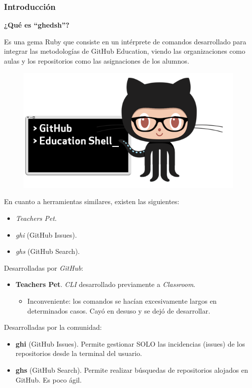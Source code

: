 \documentclass{beamer}
\begin{document}
\begin{frame}
  \frametitle{Introducción}
  \textbf{¿Qué es ``ghedsh''?}
  \bigskip

  Es una gema Ruby que consiste en un intérprete de comandos desarrollado para integrar las metodologías
  de GitHub Education, viendo las organizaciones como aulas y los repositorios como las asignaciones de los alumnos.
  
  \begin{center}
    \begin{figure}[!htb]  
        \includegraphics[width=\linewidth]{img/ghedsh-logo.png}
      \endminipage
    \end{figure}
  \end{center}

  \framebreak
  
  En cuanto a herramientas similares, existen las siguientes:
  \begin{itemize}
    \item {\it Teachers Pet}.
    \item {\it ghi} (GitHub Issues).
    \item {\it ghs} (GitHub Search).
  \end{itemize}

  \framebreak
  Desarrolladas por {\it GitHub}:
  \begin{itemize}
    \item \textbf{Teachers Pet}. {\it CLI} desarrollado previamente a {\it Classroom}.
    \begin{itemize}
      \item Inconveniente: los comandos se hacían excesivamente largos en determinados casos. 
      Cayó en desuso y se dejó de desarrollar.
    \end{itemize}
  \end{itemize}

  Desarrolladas por la comunidad:
  \begin{itemize}
    \item \textbf{ghi} (GitHub Issues). Permite gestionar SOLO las incidencias (issues) de los repositorios desde la terminal del usuario.
    \item \textbf{ghs} (GitHub Search). Permite realizar búsquedas de repositorios alojados en GitHub. Es poco ágil.
  \end{itemize}
\end{frame}
\end{document}
